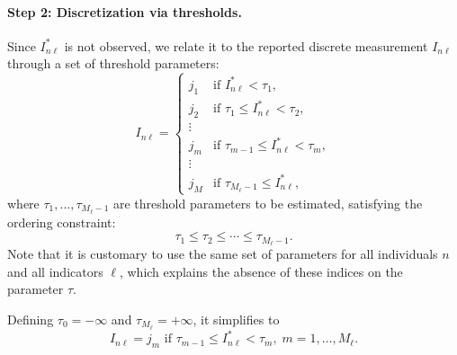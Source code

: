 \documentclass[12pt,a4paper]{article}
\begin{document}
\paragraph{Step 2: Discretization via thresholds.} Since $I^*_{n\ell}$ is not observed, we relate it to the reported discrete measurement $I_{n\ell}$ through a set of threshold parameters:
\begin{equation}
\label{eq:discreteMeas-b}
I_{n\ell} = \left\{
\begin{array}{ll}
j_1 & \text{if } I^*_{n\ell} < \tau_1, \\
j_2 & \text{if } \tau_1 \leq I^*_{n\ell} < \tau_2, \\
\vdots \\
j_m & \text{if } \tau_{m-1} \leq I^*_{n\ell} < \tau_m, \\
\vdots \\
j_M & \text{if } \tau_{M_\ell-1} \leq I^*_{n\ell},
\end{array}
\right.
\end{equation}
where $\tau_1, \ldots, \tau_{M_\ell-1}$ are threshold parameters to be estimated, satisfying the ordering constraint:
\begin{equation}
\label{eq:discreteMeas-c}
\tau_1 \leq \tau_2 \leq \cdots \leq \tau_{M_\ell-1}.
\end{equation}
Note that it is customary to use the same set of parameters for all
individuals $n$ and all indicators $\ell$, which explains the absence
of these indices on the parameter $\tau$.

Defining $\tau_0=-\infty$ and $\tau_{M_\ell}=+\infty$, it simplifies to
\begin{equation}
  \label{eq:prob_indicator}
I_{n\ell} = j_m  \text{ if } \tau_{m-1} \leq I^*_{n\ell} < \tau_m, \; m=1, \ldots, M_\ell. 
\end{equation}
\end{document}
